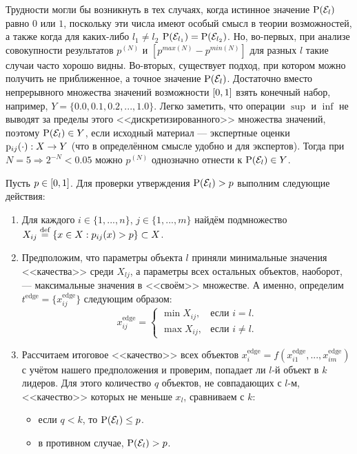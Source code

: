\documentclass{article}
\begin{document}
Трудности могли бы возникнуть в тех случаях, когда истинное значение ${\mathrm{P}}(\mathcal{E}_l)$ равно $0$ или $1$, поскольку эти числа имеют особый смысл в теории возможностей, а также когда для каких-либо $l_1 \neq l_2$ ${\mathrm{P}}(\mathcal{E}_{l_1}) = {\mathrm{P}}(\mathcal{E}_{l_2})$. Но, во-первых, при анализе совокупности результатов $p^{(N)}$ и $[p^{max(N)} - p^{min(N)}]$ для разных $l$ такие случаи часто хорошо видны. Во-вторых, существует подход, при котором можно получить не приближенное, а точное значение ${\mathrm{P}}(\mathcal{E}_l)$. Достаточно вместо непрерывного множества значений возможности $[0,1]$ взять конечный набор, например, $Y = \{0.0, 0.1, 0.2, ..., 1.0\}$. Легко заметить, что операции $\sup$ и $\inf$ не выводят за пределы этого <<дискретизированного>> множества значений, поэтому ${\mathrm{P}}(\mathcal{E}_l) \in Y$, если исходный материал --- экспертные оценки ${\mathrm{p}}_{ij}(\cdot): X \rightarrow Y$ (что в определённом смысле удобно и для экспертов). Тогда при $N = 5 \Rightarrow 2^{-N} < 0.05$ можно $p^{(N)}$ однозначно отнести к ${\mathrm{P}}(\mathcal{E}_l) \in Y$.

Пусть $p \in [0,1]$. Для проверки утверждения ${\mathrm{P}}(\mathcal{E}_l) > p$ выполним следующие действия: 
\begin{enumerate}
  \item 
  Для каждого $i \in \{1, ..., n\}$, $j \in \{1, ..., m\}$ найдём подмножество $X_{ij} \overset{\text{def}}{=} \{x \in X: p_{ij}(x) > p\} \subset X$. 
  \item 
  Предположим, что параметры объекта $l$ приняли минимальные значения <<качества>> среди $X_{lj}$, а параметры всех остальных объектов, наоборот, --- максимальные значения в <<своём>> множестве. А именно, определим $t^\text{edge} = \{x_{ij}^\text{edge}\}$ следующим образом:
  \begin{equation*}
    x_{ij}^\text{edge} =
    \begin{cases}
      \min X_{ij}, &\text{если $i = l$.}\\
      \max X_{ij}, &\text{если $i \neq l$.} 
    \end{cases}
  \end{equation*}
  \item
  Рассчитаем итоговое <<качество>> всех объектов $x_i^\text{edge} = f(x_{i1}^\text{edge}, ..., x_{im}^\text{edge})$ с учётом нашего предположения и проверим, попадает ли $l$-й объект в $k$ лидеров. Для этого количество $q$ объектов, не совпадающих с $l$-м, <<качество>> которых не меньше $x_l$, сравниваем с $k$:
 	\begin{itemize}
		\item если $q < k$, то ${\mathrm{P}}(\mathcal{E}_l) \leq p$.
		\item в противном случае, ${\mathrm{P}}(\mathcal{E}_l) > p$.
	\end{itemize} 
\end{enumerate}  
\end{document}
